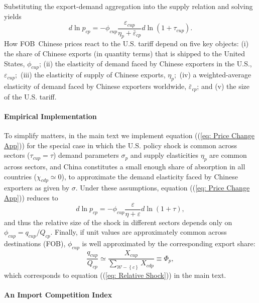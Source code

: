 \documentclass[english,12pt]{article}
\theoremstyle{definition}
\let\oldref\ref
\renewcommand{\ref}[1]{(\oldref{#1})}
\begin{document}
Substituting the export-demand aggregation into the supply relation and
solving yields 
\begin{equation}
d\ln p_{cp}=-\phi _{cup}\frac{\varepsilon _{cup}}{\eta _{p}+\bar{\varepsilon}%
_{cp}}d\ln (1+\tau _{cup}).  \label{eq: Price Change App}
\end{equation}%
How FOB\ Chinese prices react to the U.S. tariff depend on five key objects:
(i) the share of Chinese exports (in quantity terms) that is shipped to the
United States, $\phi _{cup}$; (ii) the elasticity of demand faced by Chinese
exporters in the U.S., $\varepsilon _{cup};$ (iii) the elasticity of supply
of Chinese exports, $\eta _{p};$ (iv) a weighted-average elasticity of
demand faced by Chinese exporters worldwide, $\bar{\varepsilon}_{cp}$; and
(v) the size of the U.S. tariff.

\paragraph{Empirical Implementation}

To simplify matters, in the main text we implement equation (\ref{eq: Price
Change App}) for the special case in which the U.S. policy shock is common
across sectors ($\tau _{cup}=\tau $) demand parameters $\sigma _{p}$ and
supply elasticities $\eta _{p}$ are common across sectors, and China
constitutes a small enough share of absorption in all countries ($\chi
_{cdp}\simeq 0$), to approximate the demand elasticity faced by Chinese
exporters as given by $\sigma $. Under these assumptions, equation (\ref{eq:
Price Change App}) reduces to 
\begin{equation*}
d\ln p_{cp}=-\phi _{cup}\frac{\varepsilon }{\eta +\varepsilon }d\ln (1+\tau
),
\end{equation*}%
and thus the relative size of the shock in different sectors depends only on 
$\phi _{cup}=q_{cup}/Q_{cp}$. Finally, if unit values are approximately
common across destinations (FOB), $\phi _{cup}$ is well approximated by the
corresponding export share: 
\begin{equation*}
\frac{q_{cup}}{Q_{cp}}\simeq \frac{X_{cup}}{\sum_{\mathcal{W}-\left\{
c\right\} }X_{cdp}}\equiv \Phi _{p},
\end{equation*}%
which corresponds to equation (\ref{eq: Relative Shock}) in the main text.

\paragraph{An Import Competition Index}
\end{document}
